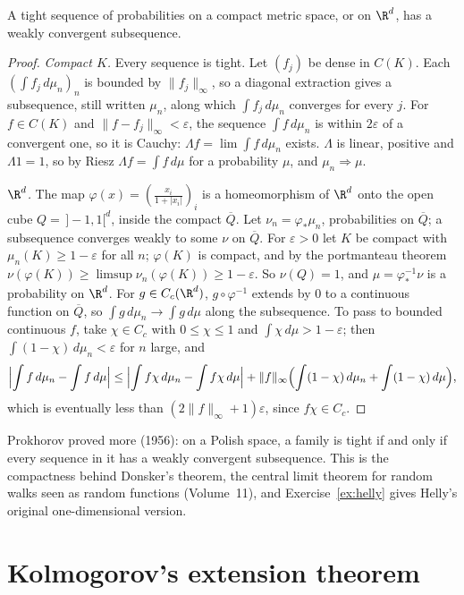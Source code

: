 \begin{theorem}[Prokhorov]\label{thm:prokhorov}
A tight sequence of probabilities on a compact metric space, or on $\R^d$, has a weakly convergent subsequence.
\end{theorem}
\begin{proof}
\emph{Compact $K$.} Every sequence is tight. Let $(f_j)$ be dense in $C(K)$. Each $(\int f_j\,d\mu_n)_n$ is bounded by $\|f_j\|_\infty$, so a diagonal extraction gives a subsequence, still written $\mu_n$, along which $\int f_j\,d\mu_n$
converges for every $j$. For $f\in C(K)$ and $\|f-f_j\|_\infty<\varepsilon$, the sequence $\int f\,d\mu_n$ is within $2\varepsilon$ of a convergent one, so it is Cauchy: $\Lambda f=\lim\int f\,d\mu_n$ exists. $\Lambda$ is linear, positive and
$\Lambda1=1$, so by Riesz $\Lambda f=\int f\,d\mu$ for a probability $\mu$, and $\mu_n\Rightarrow\mu$.

\emph{$\R^d$.} The map $\varphi(x)=(\frac{x_i}{1+|x_i|})_i$ is a homeomorphism of $\R^d$ onto the open cube $Q=\,]-1,1[^d$, inside the compact $\overline Q$. Let $\nu_n=\varphi_*\mu_n$, probabilities on $\overline Q$; a subsequence converges
weakly to some $\nu$ on $\overline Q$. For $\varepsilon>0$ let $K$ be compact with $\mu_n(K)\ge1-\varepsilon$ for all $n$; $\varphi(K)$ is compact, and by the portmanteau theorem $\nu(\varphi(K))\ge\limsup\nu_n(\varphi(K))\ge1-\varepsilon$. So
$\nu(Q)=1$, and $\mu=\varphi^{-1}_*\nu$ is a probability on $\R^d$. For $g\in C_c(\R^d)$, $g\circ\varphi^{-1}$ extends by $0$ to a continuous function on $\overline Q$, so $\int g\,d\mu_n\to\int g\,d\mu$ along the subsequence. To pass to
bounded continuous $f$, take $\chi\in C_c$ with $0\le\chi\le1$ and $\int\chi\,d\mu>1-\varepsilon$; then $\int(1-\chi)\,d\mu_n<\varepsilon$ for $n$ large, and
\[\Bigl|\int f\,d\mu_n-\int f\,d\mu\Bigr|\le\Bigl|\int f\chi\,d\mu_n-\int f\chi\,d\mu\Bigr|+\|f\|_\infty\Bigl(\int(1-\chi)\,d\mu_n+\int(1-\chi)\,d\mu\Bigr),\]
which is eventually less than $(2\|f\|_\infty+1)\varepsilon$, since $f\chi\in C_c$.
\end{proof}

Prokhorov proved more (1956): on a Polish space, a family is tight if and only if every sequence in it has a weakly convergent subsequence. This is the compactness behind Donsker's theorem, the
central limit theorem for random walks seen as random functions (Volume~11), and Exercise~\ref{ex:helly} gives Helly's original one-dimensional version.

\section{Kolmogorov's extension theorem}

